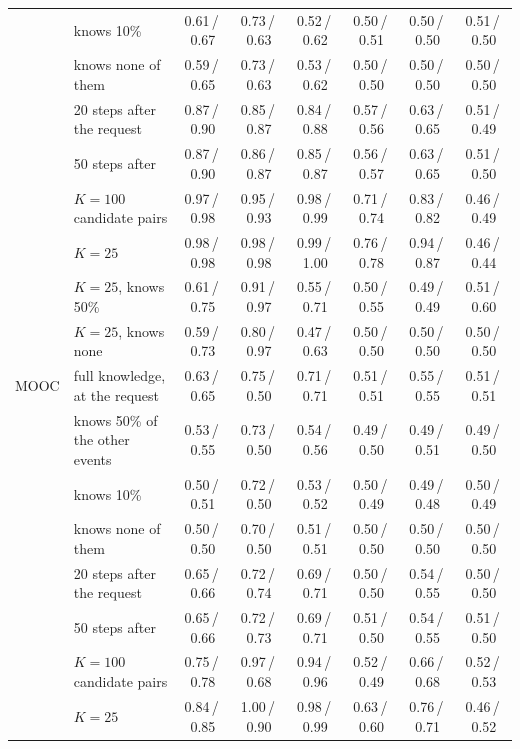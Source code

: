 \begin{table}[!htb]
\begin{tabular}{@{}llcccccc@{}}
 & knows 10\% & 0.61\,/\,0.67 & 0.73\,/\,0.63 & 0.52\,/\,0.62 & 0.50\,/\,0.51 & 0.50\,/\,0.50 & 0.51\,/\,0.50 \\
 & knows none of them & 0.59\,/\,0.65 & 0.73\,/\,0.63 & 0.53\,/\,0.62 & 0.50\,/\,0.50 & 0.50\,/\,0.50 & 0.50\,/\,0.50 \\
 & 20 steps after the request & 0.87\,/\,0.90 & 0.85\,/\,0.87 & 0.84\,/\,0.88 & 0.57\,/\,0.56 & 0.63\,/\,0.65 & 0.51\,/\,0.49 \\
 & 50 steps after & 0.87\,/\,0.90 & 0.86\,/\,0.87 & 0.85\,/\,0.87 & 0.56\,/\,0.57 & 0.63\,/\,0.65 & 0.51\,/\,0.50 \\
 & $K=100$ candidate pairs & 0.97\,/\,0.98 & 0.95\,/\,0.93 & 0.98\,/\,0.99 & 0.71\,/\,0.74 & 0.83\,/\,0.82 & 0.46\,/\,0.49 \\
 & $K=25$ & 0.98\,/\,0.98 & 0.98\,/\,0.98 & 0.99\,/\,1.00 & 0.76\,/\,0.78 & 0.94\,/\,0.87 & 0.46\,/\,0.44 \\
 & $K=25$, knows 50\% & 0.61\,/\,0.75 & 0.91\,/\,0.97 & 0.55\,/\,0.71 & 0.50\,/\,0.55 & 0.49\,/\,0.49 & 0.51\,/\,0.60 \\
 & $K=25$, knows none & 0.59\,/\,0.73 & 0.80\,/\,0.97 & 0.47\,/\,0.63 & 0.50\,/\,0.50 & 0.50\,/\,0.50 & 0.50\,/\,0.50 \\
\midrule
MOOC & full knowledge, at the request & 0.63\,/\,0.65 & 0.75\,/\,0.50 & 0.71\,/\,0.71 & 0.51\,/\,0.51 & 0.55\,/\,0.55 & 0.51\,/\,0.51 \\
 & knows 50\% of the other events & 0.53\,/\,0.55 & 0.73\,/\,0.50 & 0.54\,/\,0.56 & 0.49\,/\,0.50 & 0.49\,/\,0.51 & 0.49\,/\,0.50 \\
 & knows 10\% & 0.50\,/\,0.51 & 0.72\,/\,0.50 & 0.53\,/\,0.52 & 0.50\,/\,0.49 & 0.49\,/\,0.48 & 0.50\,/\,0.49 \\
 & knows none of them & 0.50\,/\,0.50 & 0.70\,/\,0.50 & 0.51\,/\,0.51 & 0.50\,/\,0.50 & 0.50\,/\,0.50 & 0.50\,/\,0.50 \\
 & 20 steps after the request & 0.65\,/\,0.66 & 0.72\,/\,0.74 & 0.69\,/\,0.71 & 0.50\,/\,0.50 & 0.54\,/\,0.55 & 0.50\,/\,0.50 \\
 & 50 steps after & 0.65\,/\,0.66 & 0.72\,/\,0.73 & 0.69\,/\,0.71 & 0.51\,/\,0.50 & 0.54\,/\,0.55 & 0.51\,/\,0.50 \\
 & $K=100$ candidate pairs & 0.75\,/\,0.78 & 0.97\,/\,0.68 & 0.94\,/\,0.96 & 0.52\,/\,0.49 & 0.66\,/\,0.68 & 0.52\,/\,0.53 \\
 & $K=25$ & 0.84\,/\,0.85 & 1.00\,/\,0.90 & 0.98\,/\,0.99 & 0.63\,/\,0.60 & 0.76\,/\,0.71 & 0.46\,/\,0.52 \\
\midrule

\end{tabular}
\end{table}
